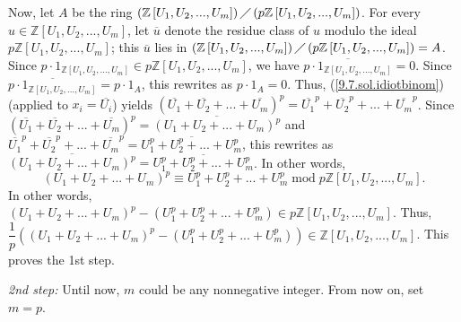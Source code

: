 \documentclass[numbers=enddot,12pt,final,onecolumn,notitlepage]{scrartcl}%
\begin{document}
Now, let $A$ be the ring $\left(  \mathbb{Z}\left[  U_{1},U_{2},...,U_{m}%
\right]  \right)  \diagup\left(  p\mathbb{Z}\left[  U_{1},U_{2},...,U_{m}%
\right]  \right)  $. For every $u\in\mathbb{Z}\left[  U_{1},U_{2}%
,...,U_{m}\right]  $, let $\overline{u}$ denote the residue class of $u$
modulo the ideal $p\mathbb{Z}\left[  U_{1},U_{2},...,U_{m}\right]  $; this
$\overline{u}$ lies in $\left(  \mathbb{Z}\left[  U_{1},U_{2},...,U_{m}%
\right]  \right)  \diagup\left(  p\mathbb{Z}\left[  U_{1},U_{2},...,U_{m}%
\right]  \right)  =A$. Since $p\cdot1_{\mathbb{Z}\left[  U_{1},U_{2}%
,...,U_{m}\right]  }\in p\mathbb{Z}\left[  U_{1},U_{2},...,U_{m}\right]  $, we
have $\overline{p\cdot1_{\mathbb{Z}\left[  U_{1},U_{2},...,U_{m}\right]  }}%
=0$. Since $\overline{p\cdot1_{\mathbb{Z}\left[  U_{1},U_{2},...,U_{m}\right]
}}=p\cdot1_{A}$, this rewrites as $p\cdot1_{A}=0$. Thus,
(\ref{9.7.sol.idiotbinom}) (applied to $x_{i}=\overline{U_{i}}$) yields
$\left(  \overline{U_{1}}+\overline{U_{2}}+...+\overline{U_{m}}\right)
^{p}=\overline{U_{1}}^{p}+\overline{U_{2}}^{p}+...+\overline{U_{m}}^{p}$.
Since $\left(  \overline{U_{1}}+\overline{U_{2}}+...+\overline{U_{m}}\right)
^{p}=\overline{\left(  U_{1}+U_{2}+...+U_{m}\right)  ^{p}}$ and $\overline
{U_{1}}^{p}+\overline{U_{2}}^{p}+...+\overline{U_{m}}^{p}=\overline{U_{1}%
^{p}+U_{2}^{p}+...+U_{m}^{p}}$, this rewrites as $\overline{\left(
U_{1}+U_{2}+...+U_{m}\right)  ^{p}}=\overline{U_{1}^{p}+U_{2}^{p}%
+...+U_{m}^{p}}$. In other words,%
\[
\left(  U_{1}+U_{2}+...+U_{m}\right)  ^{p}\equiv U_{1}^{p}+U_{2}^{p}%
+...+U_{m}^{p}\operatorname{mod}p\mathbb{Z}\left[  U_{1},U_{2},...,U_{m}%
\right]  .
\]
In other words, $\left(  U_{1}+U_{2}+...+U_{m}\right)  ^{p}-\left(  U_{1}%
^{p}+U_{2}^{p}+...+U_{m}^{p}\right)  \in p\mathbb{Z}\left[  U_{1}%
,U_{2},...,U_{m}\right]  $. Thus, $\dfrac{1}{p}\left(  \left(  U_{1}%
+U_{2}+...+U_{m}\right)  ^{p}-\left(  U_{1}^{p}+U_{2}^{p}+...+U_{m}%
^{p}\right)  \right)  \in\mathbb{Z}\left[  U_{1},U_{2},...,U_{m}\right]  $.
This proves the 1st step.

\textit{2nd step:} Until now, $m$ could be any nonnegative integer. From now
on, set $m=p$.
\end{document}
